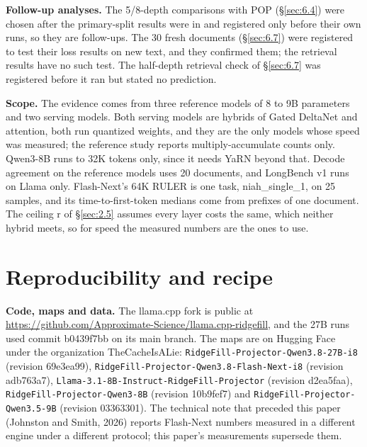 \documentclass[11pt]{article}
\begin{document}
\textbf{Follow-up analyses.} The 5/8-depth comparisons with POP (\S\ref{sec:6.4}) were chosen after the primary-split results were in and registered only before their own runs, so they are follow-ups. The 30 fresh documents (\S\ref{sec:6.7}) were registered to test their loss results on new text, and they confirmed them; the retrieval results have no such test. The half-depth retrieval check of \S\ref{sec:6.7} was registered before it ran but stated no prediction.

\textbf{Scope.} The evidence comes from three reference models of 8 to 9B parameters and two serving models. Both serving models are hybrids of Gated DeltaNet and attention, both run quantized weights, and they are the only models whose speed was measured; the reference study reports multiply-accumulate counts only. Qwen3-8B runs to 32K tokens only, since it needs YaRN beyond that. Decode agreement on the reference models uses 20 documents, and LongBench v1 runs on Llama only. Flash-Next's 64K RULER is one task, niah\_single\_1, on 25 samples, and its time-to-first-token medians come from prefixes of one document. The ceiling r of \S\ref{sec:2.5} assumes every layer costs the same, which neither hybrid meets, so for speed the measured numbers are the ones to use.


\section{Reproducibility and recipe}\label{sec:9}
\textbf{Code, maps and data.} The llama.cpp fork is public at \url{https://github.com/Approximate-Science/llama.cpp-ridgefill}, and the 27B runs used commit b0439f7bb on its main branch. The maps are on Hugging Face under the organization TheCacheIsALie: \texttt{RidgeFill-\allowbreak{}Projector-\allowbreak{}Qwen3.\allowbreak{}8-\allowbreak{}27B-\allowbreak{}i8} (revision 69e3ea99), \texttt{RidgeFill-\allowbreak{}Projector-\allowbreak{}Qwen3.\allowbreak{}8-\allowbreak{}Flash-\allowbreak{}Next-\allowbreak{}i8} (revision adb763a7), \texttt{Llama-\allowbreak{}3.\allowbreak{}1-\allowbreak{}8B-\allowbreak{}Instruct-\allowbreak{}RidgeFill-\allowbreak{}Projector} (revision d2ea5faa), \texttt{RidgeFill-\allowbreak{}Projector-\allowbreak{}Qwen3-\allowbreak{}8B} (revision 10b9fef7) and \texttt{RidgeFill-\allowbreak{}Projector-\allowbreak{}Qwen3.\allowbreak{}5-\allowbreak{}9B} (revision 03363301). The technical note that preceded this paper (Johnston and Smith, 2026) reports Flash-Next numbers measured in a different engine under a different protocol; this paper's measurements supersede them.
\end{document}
